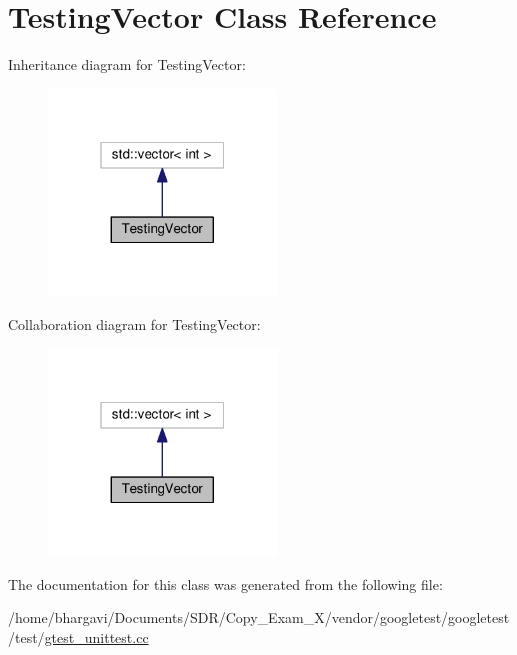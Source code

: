 \hypertarget{class_testing_vector}{}\section{Testing\+Vector Class Reference}
\label{class_testing_vector}


Inheritance diagram for Testing\+Vector\+:
\nopagebreak
\begin{figure}[H]
\begin{center}
\leavevmode
\includegraphics[width=172pt]{class_testing_vector__inherit__graph}
\end{center}
\end{figure}


Collaboration diagram for Testing\+Vector\+:
\nopagebreak
\begin{figure}[H]
\begin{center}
\leavevmode
\includegraphics[width=172pt]{class_testing_vector__coll__graph}
\end{center}
\end{figure}


The documentation for this class was generated from the following file\+:\begin{DoxyCompactItemize}
\item 
/home/bhargavi/\+Documents/\+S\+D\+R/\+Copy\+\_\+\+Exam\+\_\+X/vendor/googletest/googletest/test/\hyperlink{gtest__unittest_8cc}{gtest\+\_\+unittest.\+cc}\end{DoxyCompactItemize}
